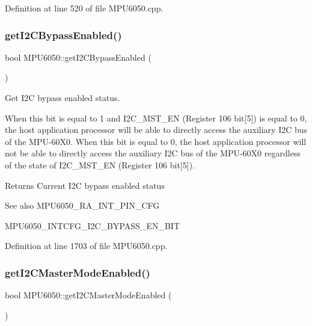 Definition at line 520 of file M\+P\+U6050.\+cpp.

\mbox{\label{classMPU6050_aed33db318a770d0020eb8b84058650f3}} 
\subsubsection{\texorpdfstring{getI2CBypassEnabled()}{getI2CBypassEnabled()}}
{\footnotesize\ttfamily bool M\+P\+U6050\+::get\+I2\+C\+Bypass\+Enabled (\begin{DoxyParamCaption}{ }\end{DoxyParamCaption})}



Get I2C bypass enabled status. 

When this bit is equal to 1 and I2\+C\+\_\+\+M\+S\+T\+\_\+\+EN (Register 106 bit\mbox{[}5\mbox{]}) is equal to 0, the host application processor will be able to directly access the auxiliary I2C bus of the M\+P\+U-\/60\+X0. When this bit is equal to 0, the host application processor will not be able to directly access the auxiliary I2C bus of the M\+P\+U-\/60\+X0 regardless of the state of I2\+C\+\_\+\+M\+S\+T\+\_\+\+EN (Register 106 bit\mbox{[}5\mbox{]}). \begin{DoxyReturn}{Returns}
Current I2C bypass enabled status 
\end{DoxyReturn}
\begin{DoxySeeAlso}{See also}
M\+P\+U6050\+\_\+\+R\+A\+\_\+\+I\+N\+T\+\_\+\+P\+I\+N\+\_\+\+C\+FG 

M\+P\+U6050\+\_\+\+I\+N\+T\+C\+F\+G\+\_\+\+I2\+C\+\_\+\+B\+Y\+P\+A\+S\+S\+\_\+\+E\+N\+\_\+\+B\+IT 
\end{DoxySeeAlso}


Definition at line 1703 of file M\+P\+U6050.\+cpp.

\mbox{\label{classMPU6050_a6b45e538f2082eb1b1975ed56e3e21bc}} 
\subsubsection{\texorpdfstring{getI2CMasterModeEnabled()}{getI2CMasterModeEnabled()}}
{\footnotesize\ttfamily bool M\+P\+U6050\+::get\+I2\+C\+Master\+Mode\+Enabled (\begin{DoxyParamCaption}{ }\end{DoxyParamCaption})}



